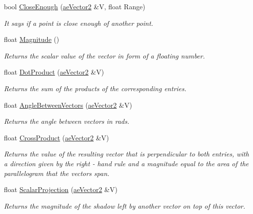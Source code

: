 \begin{DoxyCompactItemize}
\item 
bool \hyperlink{structae_core_1_1ae_vector2_a0439b7ae75d42d3cc97b8b6ab75d2f4e}{Close\+Enough} (\hyperlink{structae_core_1_1ae_vector2}{ae\+Vector2} \&V, float Range)
\begin{DoxyCompactList}\small\item\em It says if a point is close enough of another point. \end{DoxyCompactList}\item 
float \hyperlink{structae_core_1_1ae_vector2_a8f0a5de82a0f29a407acb9c2ed235e44}{Magnitude} ()
\begin{DoxyCompactList}\small\item\em Returns the scalar value of the vector in form of a floating number. \end{DoxyCompactList}\item 
float \hyperlink{structae_core_1_1ae_vector2_a76c28b0e51ec3b5465d9906f816480ad}{Dot\+Product} (\hyperlink{structae_core_1_1ae_vector2}{ae\+Vector2} \&V)
\begin{DoxyCompactList}\small\item\em Returns the sum of the products of the corresponding entries. \end{DoxyCompactList}\item 
float \hyperlink{structae_core_1_1ae_vector2_a64aa61dda394f53cc1c431af1f97cca7}{Angle\+Between\+Vectors} (\hyperlink{structae_core_1_1ae_vector2}{ae\+Vector2} \&V)
\begin{DoxyCompactList}\small\item\em Returns the angle between vectors in rads. \end{DoxyCompactList}\item 
float \hyperlink{structae_core_1_1ae_vector2_a3568b61e4b6c113f2343e0050ea0fe9c}{Cross\+Product} (\hyperlink{structae_core_1_1ae_vector2}{ae\+Vector2} \&V)
\begin{DoxyCompactList}\small\item\em Returns the value of the resulting vector that is perpendicular to both entries, with a direction given by the right -\/ hand rule and a magnitude equal to the area of the parallelogram that the vectors span. \end{DoxyCompactList}\item 
float \hyperlink{structae_core_1_1ae_vector2_ab69650579a4fcdf0259eac57372923d5}{Scalar\+Projection} (\hyperlink{structae_core_1_1ae_vector2}{ae\+Vector2} \&V)
\begin{DoxyCompactList}\small\item\em Returns the magnitude of the shadow left by another vector on top of this vector. \end{DoxyCompactList}\item 

\end{DoxyCompactItemize}
